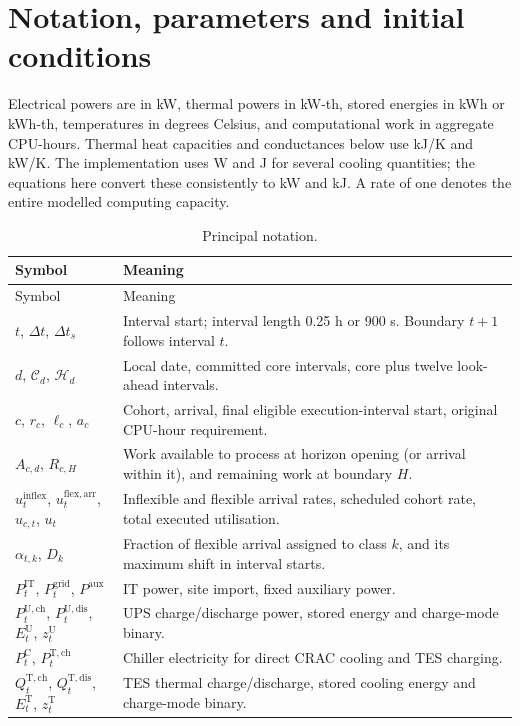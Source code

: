 \section{Notation, parameters and initial conditions}
Electrical powers are in kW, thermal powers in kW-th, stored energies in kWh or kWh-th, temperatures in degrees Celsius, and computational work in aggregate CPU-hours. Thermal heat capacities and conductances below use kJ/K and kW/K. The implementation uses W and J for several cooling quantities; the equations here convert these consistently to kW and kJ. A rate of one denotes the entire modelled computing capacity.

\begin{longtable}{@{}p{}p{}@{}}
\caption{Principal notation.}\label{tab:symbols}\\\toprule
Symbol & Meaning\\\midrule\endfirsthead
\toprule Symbol & Meaning\\\midrule\endhead
$t$, $\Delta t$, $\Delta t_s$ & Interval start; interval length 0.25 h or 900 s. Boundary $t+1$ follows interval $t$.\\
$d$, $\mathcal C_d$, $\mathcal H_d$ & Local date, committed core intervals, core plus twelve look-ahead intervals.\\
$c$, $r_c$, $\ell_c$, $a_c$ & Cohort, arrival, final eligible execution-interval start, original CPU-hour requirement.\\
$A_{c,d}$, $R_{c,H}$ & Work available to process at horizon opening (or arrival within it), and remaining work at boundary $H$.\\
$u^{\mathrm{inflex}}_t$, $u^{\mathrm{flex,arr}}_t$, $u_{c,t}$, $u_t$ & Inflexible and flexible arrival rates, scheduled cohort rate, total executed utilisation.\\
$\alpha_{t,k}$, $D_k$ & Fraction of flexible arrival assigned to class $k$, and its maximum shift in interval starts.\\
$P^{\mathrm{IT}}_t$, $P^{\mathrm{grid}}_t$, $P^{\mathrm{aux}}$ & IT power, site import, fixed auxiliary power.\\
$P^{\mathrm{U,ch}}_t$, $P^{\mathrm{U,dis}}_t$, $E^{\mathrm U}_t$, $z_t^{\mathrm U}$ & UPS charge/discharge power, stored energy and charge-mode binary.\\
$P^{\mathrm C}_t$, $P^{\mathrm{T,ch}}_t$ & Chiller electricity for direct CRAC cooling and TES charging.\\
$Q^{\mathrm{T,ch}}_t$, $Q^{\mathrm{T,dis}}_t$, $E^{\mathrm T}_t$, $z_t^{\mathrm T}$ & TES thermal charge/discharge, stored cooling energy and charge-mode binary.\\

\end{longtable}
